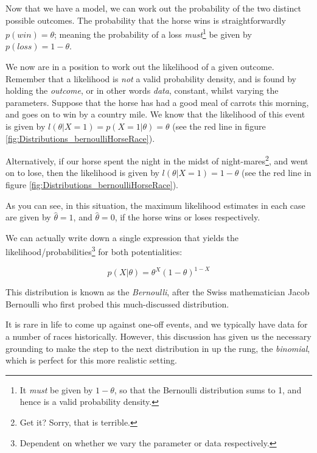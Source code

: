 \documentclass[11pt,fullpage]{book}
\begin{document}
Now that we have a model, we can work out the probability of the two distinct possible outcomes. The probability that the horse wins is straightforwardly $p(win)=\theta$; meaning the probability of a loss \textit{must}\footnote{It \textit{must} be given by $1-\theta$, so that the Bernoulli distribution sums to 1, and hence is a valid probability density.} be given by $p(loss)=1-\theta$.

We now are in a position to work out the likelihood of a given outcome. Remember that a likelihood is \textit{not} a valid probability density, and is found by holding the \textit{outcome}, or in other words \textit{data}, constant, whilst varying the parameters. Suppose that the horse has had a good meal of carrots this morning, and goes on to win by a country mile. We know that the likelihood of this event is given by $l(\theta|X=1)=p(X=1|\theta)=\theta$ (see the red line in figure \ref{fig:Distributions_bernoulliHorseRace}).

Alternatively, if our horse spent the night in the midst of night-mares\footnote{Get it? Sorry, that is terrible.}, and went on to lose, then the likelihood is given by $l(\theta|X=1)=1-\theta$ (see the red line in figure \ref{fig:Distributions_bernoulliHorseRace}).

As you can see, in this situation, the maximum likelihood estimates in each case are given by $\hat{\theta}=1$, and $\hat{\theta}=0$, if the horse wins or loses respectively.

We can actually write down a single expression that yields the likelihood/probabilities\footnote{Dependent on whether we vary the parameter or data respectively.} for both potentialities:

\begin{equation}\label{eq:Distributions_binomialDefinition}
p(X|\theta) = \theta^X (1-\theta)^{1-X}
\end{equation}

This distribution is known as the \textit{Bernoulli}, after the Swiss mathematician Jacob Bernoulli who first probed this much-discussed distribution.

It is rare in life to come up against one-off events, and we typically have data for a number of races historically.  However, this discussion has given us the necessary grounding to make the step to the next distribution in up the rung, the \textit{binomial}, which is perfect for this more realistic setting.
\end{document}
